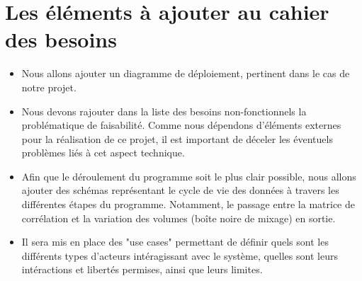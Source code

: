 \documentclass[a4paper]{article}
\begin{document}
\section*{Les éléments à ajouter au cahier des besoins}

\begin{itemize}

\item Nous allons ajouter un diagramme de déploiement, pertinent dans le cas de notre projet.

\item Nous devons rajouter dans la liste des besoins non-fonctionnels la problématique de faisabilité. Comme nous dépendons d'éléments externes pour la réalisation de ce projet, il est important de déceler les éventuels problèmes liés à cet aspect technique.

\item Afin que le déroulement du programme soit le plus clair possible, nous allons ajouter des schémas représentant le cycle de vie des données à travers les différentes étapes du programme. Notamment, le passage entre la matrice de corrélation et la variation des volumes (boîte noire de mixage) en sortie.

\item Il sera mis en place des "use cases" permettant de définir quels sont les différents types d'acteurs intéragissant avec le système, quelles sont leurs intéractions et libertés permises, ainsi que leurs limites.
\end{itemize}
\end{document}

